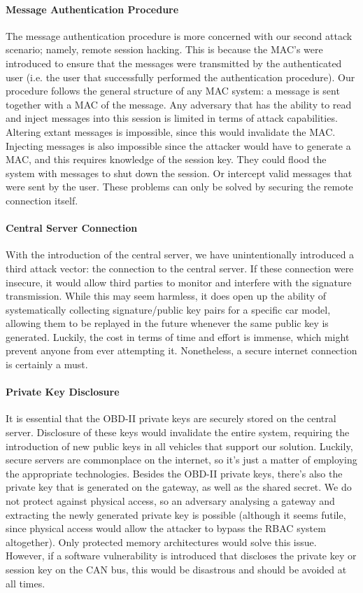 \paragraph{Message Authentication Procedure}
The message authentication procedure is more concerned with our second attack scenario; namely, remote session hacking. This is because the MAC's were introduced to ensure that the messages were transmitted by the authenticated user (i.e. the user that successfully performed the authentication procedure). Our procedure follows the general structure of any MAC system: a message is sent together with a MAC of the message. Any adversary that has the ability to read and inject messages into this session is limited in terms of attack capabilities. Altering extant messages is impossible, since this would invalidate the MAC. Injecting messages is also impossible since the attacker would have to generate a MAC, and this requires knowledge of the session key. They could flood the system with messages to shut down the session. Or intercept valid messages that were sent by the user. These problems can only be solved by securing the remote connection itself.  

\paragraph{Central Server Connection} With the introduction of the central server, we have unintentionally introduced a third attack vector: the connection to the central server. If these connection were insecure, it would allow third parties to monitor and interfere with the signature transmission. While this may seem harmless, it does open up the ability of systematically collecting signature/public key pairs for a specific car model, allowing them to be replayed in the future whenever the same public key is generated. Luckily, the cost in terms of time and effort is immense, which might prevent anyone from ever attempting it. Nonetheless, a secure internet connection is certainly a must.

\paragraph{Private Key Disclosure} It is essential that the OBD-II private keys are securely stored on the central server. Disclosure of these keys would invalidate the entire system, requiring the introduction of new public keys in all vehicles that support our solution. Luckily, secure servers are commonplace on the internet, so it's just a matter of employing the appropriate technologies. Besides the OBD-II private keys, there's also the private key that is generated on the gateway, as well as the shared secret. We do not protect against physical access, so an adversary analysing a gateway and extracting the newly generated private key is possible (although it seems futile, since physical access would allow the attacker to bypass the RBAC system altogether). Only protected memory architectures would solve this issue. However, if a software vulnerability is introduced that discloses the private key or session key on the CAN bus, this would be disastrous and should be avoided at all times.

